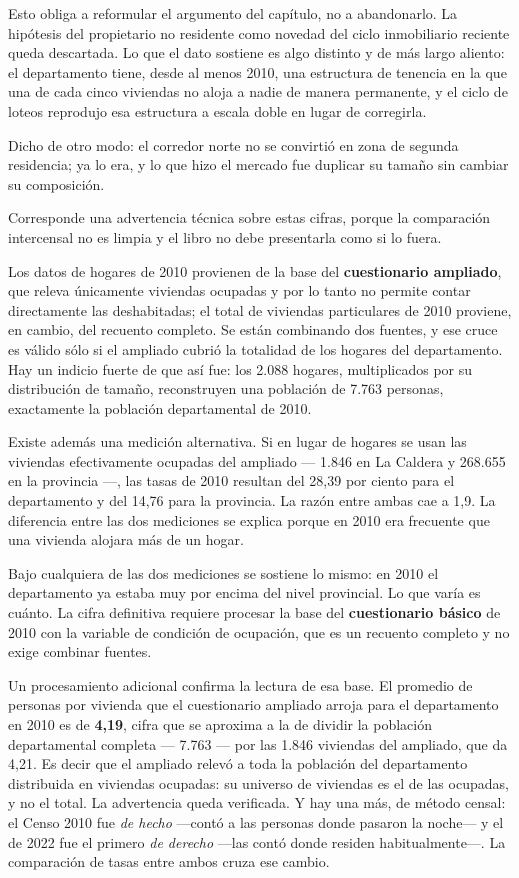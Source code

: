 Esto obliga a reformular el argumento del capítulo, no a abandonarlo. La hipótesis del propietario no residente como novedad del ciclo inmobiliario reciente queda descartada. Lo que el dato sostiene es algo distinto y de más largo aliento: el departamento tiene, desde al menos 2010, una estructura de tenencia en la que una de cada cinco viviendas no aloja a nadie de manera permanente, y el ciclo de loteos reprodujo esa estructura a escala doble en lugar de corregirla.

Dicho de otro modo: el corredor norte no se convirtió en zona de segunda residencia; ya lo era, y lo que hizo el mercado fue duplicar su tamaño sin cambiar su composición.

\begin{cautela}
Corresponde una advertencia técnica sobre estas cifras, porque la comparación intercensal no es limpia y el libro no debe presentarla como si lo fuera.

Los datos de hogares de 2010 provienen de la base del \textbf{cuestionario ampliado}, que releva únicamente viviendas ocupadas y por lo tanto no permite contar directamente las deshabitadas; el total de viviendas particulares de 2010 proviene, en cambio, del recuento completo. Se están combinando dos fuentes, y ese cruce es válido sólo si el ampliado cubrió la totalidad de los hogares del departamento. Hay un indicio fuerte de que así fue: los 2.088 hogares, multiplicados por su distribución de tamaño, reconstruyen una población de 7.763 personas, exactamente la población departamental de 2010.

Existe además una medición alternativa. Si en lugar de hogares se usan las viviendas efectivamente ocupadas del ampliado --- 1.846 en La Caldera y 268.655 en la provincia ---, las tasas de 2010 resultan del 28,39 por ciento para el departamento y del 14,76 para la provincia. La razón entre ambas cae a 1,9. La diferencia entre las dos mediciones se explica porque en 2010 era frecuente que una vivienda alojara más de un hogar.

Bajo cualquiera de las dos mediciones se sostiene lo mismo: en 2010 el departamento ya estaba muy por encima del nivel provincial. Lo que varía es cuánto. La cifra definitiva requiere procesar la base del \textbf{cuestionario básico} de 2010 con la variable de condición de ocupación, que es un recuento completo y no exige combinar fuentes.

Un procesamiento adicional confirma la lectura de esa base. El promedio de personas por vivienda que el cuestionario ampliado arroja para el departamento en 2010 es de \textbf{4,19}, cifra que se aproxima a la de dividir la población departamental completa --- 7.763 --- por las 1.846 viviendas del ampliado, que da 4,21. Es decir que el ampliado relevó a toda la población del departamento distribuida en viviendas ocupadas: su universo de viviendas es el de las ocupadas, y no el total. La advertencia queda verificada. Y hay una más, de método censal: el Censo 2010 fue \textit{de hecho} ---contó a las personas donde pasaron la noche--- y el de 2022 fue el primero \textit{de derecho} ---las contó donde residen habitualmente---. La comparación de tasas entre ambos cruza ese cambio.
\end{cautela}

